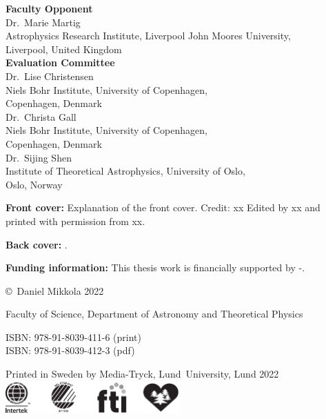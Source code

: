 \documentclass[E5,LUFonts]{lundphdthesis}
\begin{document}
\maketitle


\newpage
\begin{center}
	\textbf{Faculty Opponent} \\
	\vspace{1em}
	Dr.\ Marie Martig\\
	Astrophysics Research Institute, Liverpool John Moores University,\\
	Liverpool, United Kingdom\\
	\vspace{1.5em}
	\textbf{Evaluation Committee} \\
	\vspace{1em}
    Dr.\ Lise Christensen\\
    Niels Bohr Institute, University of Copenhagen,\\
    Copenhagen, Denmark\\
    \vspace{0.7em}
    Dr.\ Christa Gall\\
    Niels Bohr Institute, University of Copenhagen,\\
    Copenhagen, Denmark\\
	\vspace{0.7em}
    Dr.\ Sijing Shen\\
    Institute of Theoretical Astrophysics, University of Oslo,\\
    Oslo, Norway\\
\end{center}
\vfill

{\small\parindent0pt
\textbf{Front cover:} Explanation of the front cover.
Credit: xx Edited by xx and printed with permission from xx.

\textbf{Back cover:} .

\textbf{Funding information:} This thesis work is financially supported by -.

\vspace{1em}
\copyright\, Daniel Mikkola 2022

\vspace{1em}
Faculty of Science, Department of Astronomy and Theoretical Physics

\vspace{1em}
ISBN: 978-91-8039-411-6 (print)\\ %
ISBN: 978-91-8039-412-3 (pdf) %

\vspace{1em}
Printed in Sweden by Media-Tryck, Lund~University, Lund 2022\\
\includegraphics[width=0.5\textwidth]{logo/miljoeloggor}
}
\end{document}
